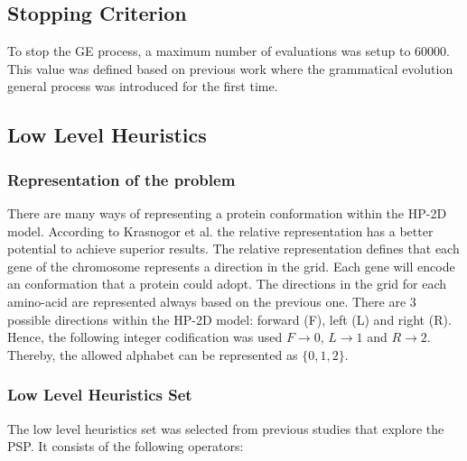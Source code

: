 \documentclass[conference]{IEEEtran}
\begin{document}
\subsection{Stopping Criterion}
\label{sub:criterioParada}

To stop the GE process, a maximum number of evaluations was setup to 60000. This value was defined based on previous work \cite{ryan1998grammatical} where the grammatical evolution general process was introduced for the first time. 

  \subsection{Low Level Heuristics} 
  
  \subsubsection{Representation of the problem} 
  There are many ways of representing a protein conformation within the HP-2D model. According to Krasnogor et al. \cite{krasnogor1999protein}  the relative representation has a better potential to achieve superior results. The relative representation defines that each gene of the chromosome represents a direction in the grid. Each gene will encode an conformation that a protein could adopt.
  The directions in the grid for each amino-acid are represented always based on the previous one. There are 3 possible directions within the HP-2D model: forward (F), left (L) and right (R). Hence, the following integer codification was used $F\rightarrow0$, $L\rightarrow1$ and $R\rightarrow2$. Thereby, the allowed alphabet can be represented as $\{0,1,2\}$.  

  \subsubsection{Low Level Heuristics Set}
 The low level heuristics set was selected from previous studies \cite{benitez2015algoritmo,custodio2014multiple, custodio2004investigation, garza2012multiobjectivizing} that explore the PSP. It consists of the following operators:
 
\end{document}
